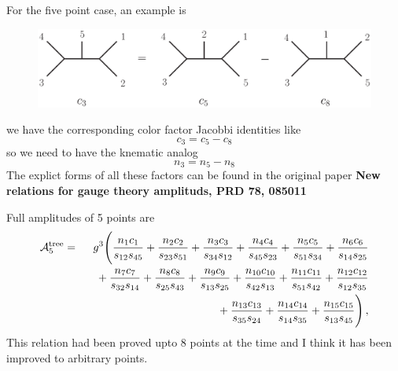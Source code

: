 \documentclass{beamer}
\begin{document}
\begin{frame}
    For the five point case, an example is 
    \begin{figure}[htb]
        \centering
        \includegraphics[width=1\linewidth]{FivePtTwist2.eps}
    \end{figure}
    we have the corresponding color factor Jacobbi identities like
    \begin{equation*}
        c_3=c_5-c_8
    \end{equation*}
    so we need to have the knematic analog
    \begin{equation*}
        n_3=n_5-n_8
    \end{equation*}
    The explict forms of all these factors can be found in the original paper \textbf{New relations for gauge theory amplituds, PRD 78, 085011}
\end{frame}
\begin{frame}
    Full amplitudes of 5 points are
    \begin{eqnarray*}
        \mathcal {A}^\mathrm{tree}_5& = & 
        g^3\Biggl( {n_1 c_1\over s_{12}s_{45}}+{n_2 c_2\over s_{23}s_{51}}
        +{n_3 c_3 \over s_{34}s_{12}}+{n_4 c_4\over s_{45}s_{23}}
        +{n_5 c_5\over s_{51}s_{34}} +{n_{6} c_6\over s_{14}s_{25}}  \\
        &&\null \hskip .3 cm 
        + {n_7 c_7\over s_{32}s_{14}}+{n_{8} c_8\over s_{25}s_{43}}
        +{n_{9} c_9\over s_{13}s_{25}}+{n_{10} c_{10}\over s_{42}s_{13}}
        +{n_{11} c_{11}\over s_{51}s_{42}}+ {n_{12} c_{12}\over s_{12}s_{35}}  \\
        &&\null \hskip .3 cm 
        +{n_{13} c_{13}\over s_{35}s_{24}} 
        +{n_{14} c_{14}\over s_{14}s_{35}}
        +{n_{15} c_{15}\over s_{13}s_{45}}\Biggr)\,,
        \end{eqnarray*}
    This relation had been proved upto 8 points at the time and I think it has been improved to arbitrary points.  
\end{frame}
\fi
\end{document}
